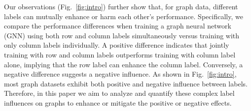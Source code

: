 


Our observations (Fig.~\ref{fig:intro}) further show that, for graph data, different labels can mutually enhance or harm each other's performance. 
Specifically, we compare the performance differences when training a graph neural network (GNN) using both row and column labels simultaneously versus training with only column labels individually. A positive difference indicates that jointly training with row and column labels outperforms training with column label alone, implying that the row label can enhance the column label. Conversely, a negative difference suggests a negative influence. As shown in Fig.~\ref{fig:intro}, most graph datasets exhibit both positive and negative influence between labels. Therefore, in this paper we aim to analyze and quantify these complex label influences on graphs to enhance or mitigate the positive or negative effects.


